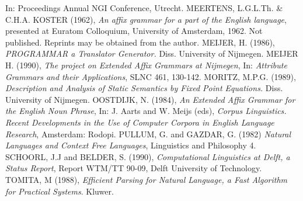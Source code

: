\begin{thebibliography}{88}
In: Proceedings Annual NGI Conference, Utrecht.
MEERTENS, L.G.L.Th. \& C.H.A. KOSTER (1962), 	
{\em An affix grammar for a part of the English language}, presented at
Euratom Colloquium, University of Amsterdam, 1962.
Not published. Reprints may be obtained from the author.
MEIJER, H. (1986),
{\em PROGRAMMAR a Translator Generator.}
Diss. University of Nijmegen.
MEIJER H. (1990),
{\em The project on Extended Affix Grammars at Nijmegen},
In: {\em Attribute Grammars and their Applications}, SLNC 461, 130-142.
MORITZ, M.P.G. (1989),
{\em Description and Analysis of Static Semantics by Fixed Point Equations.}
Diss. University of Nijmegen.
OOSTDIJK, N. (1984),
{\em An Extended Affix Grammar for the English Noun Phrase}, In:
J. Aarts and W. Meijs (eds),
{\em Corpus Linguistics. Recent Developments in the Use of Computer
Corpora in English Language Research}, Amsterdam: Rodopi.
PULLUM, G. and GAZDAR, G. (1982)
{\em Natural Languages and Context Free Languages},
Linguistics and Philosophy 4.
SCHOORL, J.J and BELDER, S. (1990),
{\em Computational Linguistics at Delft, a Status Report},
Report WTM/TT 90-09, Delft University of Technology.
TOMITA, M (1988),
{\em Efficient Parsing for Natural Language, a Fast Algorithm for
Practical Systems}.
Kluwer.
\end{thebibliography}


